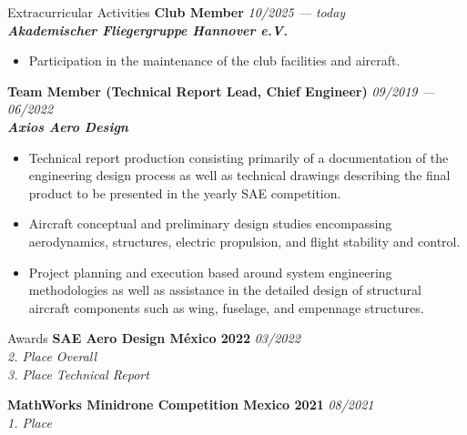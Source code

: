\documentclass[a4paper]{resume} %
\begin{document}
    
    
    \begin{rSection}{Extracurricular Activities}
         {\bf Club Member} \hfill {\itshape 10/2025 --- today} 
         \\{\textit{\textbf{Akademischer Fliegergruppe Hannover e.V.}}}
         \vspace{-0.5em}
         \begin{itemize}
         	\item Participation in the maintenance of the club facilities and aircraft.
         \end{itemize}
        
        {\bf Team Member (Technical Report Lead, Chief Engineer)} \hfill {\itshape 09/2019 --- 06/2022} 
        \\{\textit{\textbf{Axios Aero Design}}}
        \vspace{-0.5em}
        \begin{itemize}
        	\item Technical report production consisting primarily of a documentation of the engineering design process as well as technical drawings describing the final product to be presented in the yearly SAE competition.
            \item Aircraft conceptual and preliminary design studies encompassing aerodynamics, structures, electric propulsion, and flight stability and control.
            \item Project planning and execution based around system engineering methodologies as well as assistance in the detailed design of structural aircraft components such as wing, fuselage, and empennage structures.
        \end{itemize}
    \end{rSection}
    
    \begin{rSection}{Awards}
        {\bf SAE Aero Design México 2022} \hfill {\itshape 03/2022}
        \\{\textit{2. Place Overall}}
        \\{\textit{3. Place Technical Report}}
    
        {\bf MathWorks Minidrone Competition Mexico 2021} \hfill {\itshape 08/2021}
        \\{\textit{1. Place}}
        
    \end{rSection}
\end{document}
